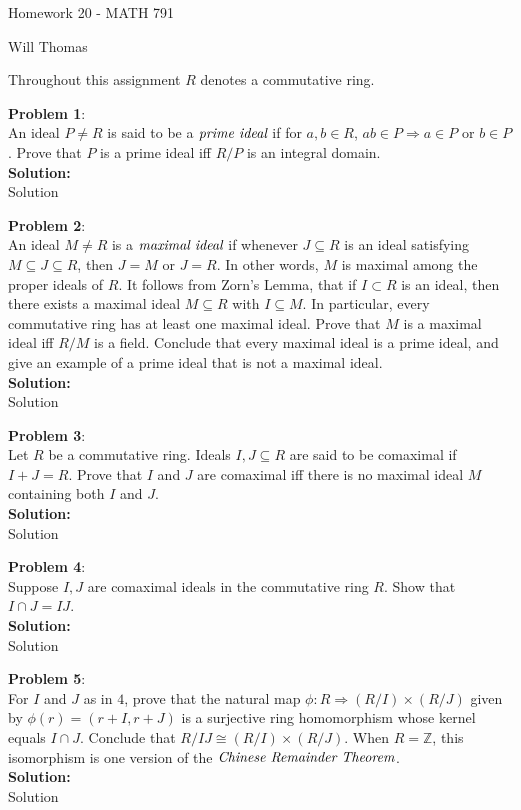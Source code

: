 \documentclass[11pt]{article}
\newcommand{\prob}[3]{\begin{flushleft}
        \textbf{Problem #1}: \\
        #2 
		\textbf{Solution:} 
		#3

\end{flushleft}}
\newcommand{\B}[1]{%
	\mathbb{#1}
}
\newcommand{\makeHWtitle}[1]{
    \begin{center}
    \Large{Homework #1 - MATH 791} 
        \vspace{5pt}
        
        \normalsize{Will Thomas}
        \vspace{5pt}
    \end{center}
}
\begin{document}
\makeHWtitle{20}
Throughout this assignment $R$ denotes a commutative ring.

\prob{1}{
An ideal $P \neq R$ is said to be a $\emph{prime ideal}$ if for $a, b \in R$, $ab \in P \Rightarrow a \in P $ or $b \in P$. Prove that $P$ is a prime ideal iff $R/P$ is an integral domain.\\
}
{\\
Solution
}

\prob{2}{
An ideal $M \neq R$ is a $\emph{maximal ideal}$ if whenever $J \subseteq R$ is an ideal satisfying $M \subseteq J \subseteq R$, then $J = M$ or $J = R$. In other words, $M$ is maximal among the proper ideals of $R$. It follows from Zorn's Lemma, that if $I \subset R$ is an ideal, then there exists a maximal ideal $M \subseteq R$ with $I \subseteq M$. In particular, every commutative ring has at least one maximal ideal. Prove that $M$ is a maximal ideal iff $R/M$ is a field. Conclude that every maximal ideal is a prime ideal, and give an example of a prime ideal that is not a maximal ideal.
\\
}
{\\
Solution
}

\prob{3}{
Let $R$ be a commutative ring. Ideals $I, J \subseteq R$ are said to be comaximal if $I + J = R$. Prove that $I$ and $J$ are comaximal iff there is no maximal ideal $M$ containing both $I$ and $J$.
\\
}
{\\
Solution
}

\prob{4}{
Suppose $I, J$ are comaximal ideals in the commutative ring $R$. Show that $I \cap J = IJ$.
\\
}
{\\
Solution
}


\prob{5}{
For $I$ and $J$ as in $4$, prove that the natural map $\phi: R \Rightarrow (R/I) \times (R/J)$ given by $\phi (r) = (r + I, r + J)$ is a surjective ring homomorphism whose kernel equals $I \cap J$. Conclude that $R/IJ \cong (R/I) \times (R/J)$. When $R = \B{Z}$, this isomorphism is one version of the $\emph{Chinese Remainder Theorem}$.
\\
}
{\\
Solution
}
\end{document}
